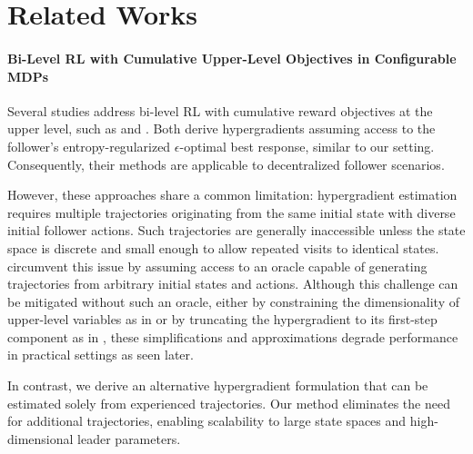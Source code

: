 \documentclass[letterpaper]{article} %
\begin{document}
\section{Related Works}


\paragraph{Bi-Level RL with Cumulative Upper-Level Objectives in Configurable MDPs}
Several studies address bi-level RL with cumulative reward objectives at the upper level, such as \citet{Thoma2024-em} and \citet{Yang2025-lr}. 
Both derive hypergradients assuming access to the follower's entropy-regularized $\epsilon$-optimal best response, similar to our setting. 
Consequently, their methods are applicable to decentralized follower scenarios.

However, these approaches share a common limitation: hypergradient estimation requires multiple trajectories originating from the same initial state with diverse initial follower actions.
Such trajectories are generally inaccessible unless the state space is discrete and small enough to allow repeated visits to identical states.
\citet{Thoma2024-em} circumvent this issue by assuming access to an oracle capable of generating trajectories from arbitrary initial states and actions.  
Although this challenge can be mitigated without such an oracle, either by constraining the dimensionality of upper-level variables as in \citet{Thoma2024-em} or by truncating the hypergradient to its first-step component as in \citet{Yang2025-lr}, these simplifications and approximations degrade performance in practical settings as seen later.

In contrast, we derive an alternative hypergradient formulation that can be estimated solely from experienced trajectories.
Our method eliminates the need for additional trajectories, enabling scalability to large state spaces and high-dimensional leader parameters.
\end{document}

